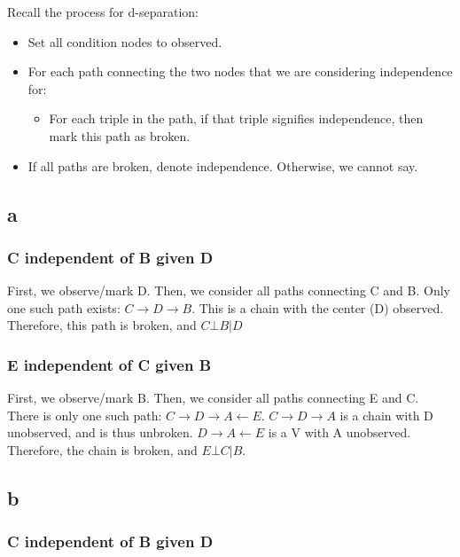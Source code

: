 \documentclass{article}
\begin{document}
Recall the process for d-separation:

\begin{itemize}
    \item Set all condition nodes to observed.
    \item For each path connecting the two nodes that we are considering independence for:
    \begin{itemize}
        \item For each triple in the path, if that triple signifies independence, 
            then mark this path as broken.
    \end{itemize}
    \item If all paths are broken, denote independence. Otherwise, we cannot say.
\end{itemize}

\subsection{a}

\subsubsection{C independent of B given D}

First, we observe/mark D. Then, we consider all paths connecting C and B. Only one 
such path exists: $C \rightarrow D \rightarrow B$. This is a chain with the 
center (D) observed. Therefore, this path is broken, and $C \bot B | D$

\subsubsection{E independent of C given B}

First, we observe/mark B. Then, we consider all paths connecting E and C. There 
is only one such path: $ C \rightarrow D \rightarrow A \leftarrow E $. 
$C \rightarrow D \rightarrow A$ is a chain with D unobserved, and is thus 
unbroken. $ D \rightarrow A \leftarrow E $ is a V with A unobserved. Therefore, 
the chain is broken, and $ E \bot C | B $.

\subsection{b}

\subsubsection{C independent of B given D}
\end{document}
